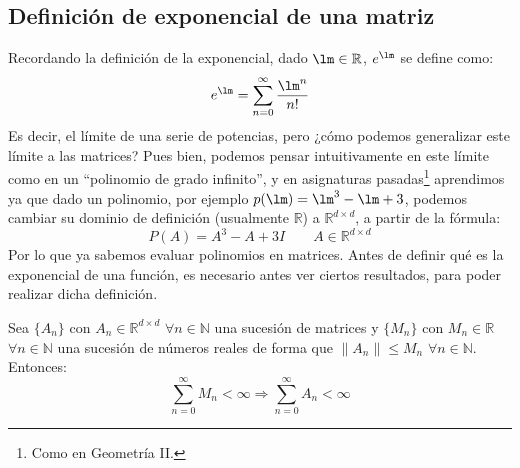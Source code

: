 \subsection{Definición de exponencial de una matriz}
Recordando la definición de la exponencial, dado $\lm \in \mathbb{R}$, $e^\lm$ se define como:
\begin{equation*}
    e^\lm = \sum_{n=0}^{\infty}\dfrac{\lm^n}{n!}
\end{equation*}
Es decir, el límite de una serie de potencias, pero ¿cómo podemos generalizar este límite a las matrices? Pues bien, podemos pensar intuitivamente en este límite como en un ``polinomio de grado infinito'', y en asignaturas pasadas\footnote{Como en Geometría II.} aprendimos ya que dado un polinomio, por ejemplo $p(\lm)=\lm^3 - \lm + 3$, podemos cambiar su dominio de definición (usualmente $\mathbb{R}$) a $\mathbb{R}^{d\times d}$, a partir de la fórmula:
\begin{equation*}
    P(A) = A^3 - A + 3I \qquad A\in \mathbb{R}^{d\times d}
\end{equation*}
Por lo que ya sabemos evaluar polinomios en matrices. Antes de definir qué es la exponencial de una función, es necesario antes ver ciertos resultados, para poder realizar dicha definición.

\begin{lema}\label{lema:1_exp}
    Sea $\{A_n\}$ con $A_n\in \mathbb{R}^{d\times d}$ $\forall n\in \mathbb{N}$ una sucesión de matrices y $\{M_n\}$ con $M_n\in \mathbb{R}$ $\forall n\in \mathbb{N}$ una sucesión de números reales de forma que $\|A_n\|\leq M_n$ $\forall n\in \mathbb{N}$. Entonces:
    \begin{equation*}
        \sum_{n=0}^{\infty}M_n < \infty
        \Longrightarrow
        \sum_{n=0}^{\infty}A_n < \infty
    \end{equation*}
\end{lema}

